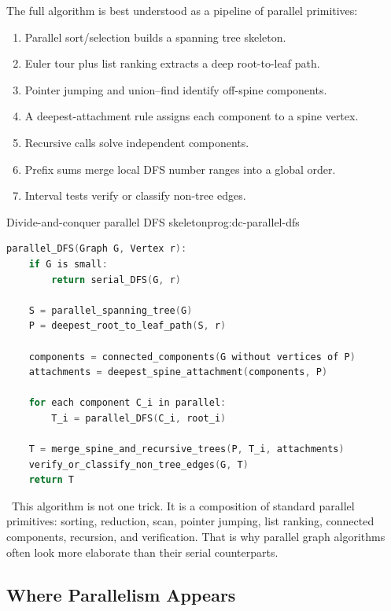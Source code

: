 The full algorithm is best understood as a pipeline of parallel primitives:

\begin{enumerate}
    \item Parallel sort/selection builds a spanning tree skeleton.
    \item Euler tour plus list ranking extracts a deep root-to-leaf path.
    \item Pointer jumping and union--find identify off-spine components.
    \item A deepest-attachment rule assigns each component to a spine vertex.
    \item Recursive calls solve independent components.
    \item Prefix sums merge local DFS number ranges into a global order.
    \item Interval tests verify or classify non-tree edges.
\end{enumerate}

\begin{ppprogram}{Divide-and-conquer parallel DFS skeleton}{prog:dc-parallel-dfs}
\begin{lstlisting}[language=C]
parallel_DFS(Graph G, Vertex r):
    if G is small:
        return serial_DFS(G, r)

    S = parallel_spanning_tree(G)
    P = deepest_root_to_leaf_path(S, r)

    components = connected_components(G without vertices of P)
    attachments = deepest_spine_attachment(components, P)

    for each component C_i in parallel:
        T_i = parallel_DFS(C_i, root_i)

    T = merge_spine_and_recursive_trees(P, T_i, attachments)
    verify_or_classify_non_tree_edges(G, T)
    return T
\end{lstlisting}
\end{ppprogram}

\begin{ppkey}
\ This algorithm is not one trick.
It is a composition of standard parallel primitives: sorting, reduction, scan, pointer jumping, list ranking, connected components, recursion, and verification.
That is why parallel graph algorithms often look more elaborate than their serial counterparts.
\end{ppkey}

\subsection{Where Parallelism Appears}

